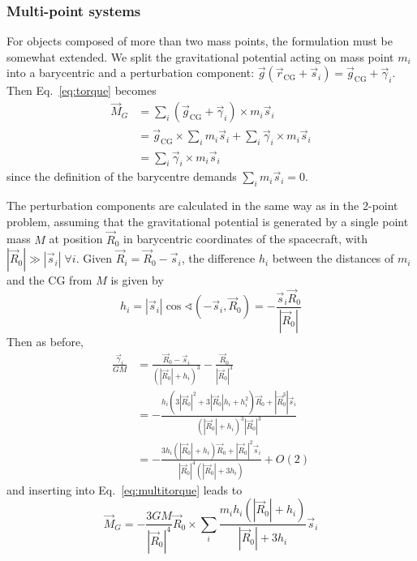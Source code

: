 \documentclass[Orbiter Technical Reference.tex]{subfiles}
\begin{document}
\subsubsection{Multi-point systems}
For objects composed of more than two mass points, the formulation must be somewhat extended. We split the gravitational potential acting on mass point $m_i$ into a barycentric and a perturbation component: $\vec{g}(\vec{r}_\text{CG} + \vec{s}_i) = \vec{g}_\text{CG} + \vec{\gamma}_i$.
Then Eq.~\ref{eq:torque} becomes
\begin{equation}\label{eq:multitorque}
\begin{split}
\vec{M}_G &= \sum_i (\vec{g}_\text{CG} + \vec{\gamma}_i) \times m_i \vec{s}_i\\
&= \vec{g}_\text{CG} \times \sum_i m_i \vec{s}_i + \sum_i \vec{\gamma}_i \times m_i \vec{s}_i\\
&= \sum_i \vec{\gamma}_i \times m_i \vec{s}_i
\end{split}
\end{equation}
since the definition of the barycentre demands $\sum_i m_i \vec{s}_i = 0$.

The perturbation components are calculated in the same way as in the 2-point problem, assuming that the gravitational potential is generated by a single point mass $M$ at position $\vec{R}_0$ in barycentric coordinates of the spacecraft, with $|\vec{R}_0| \gg |\vec{s}_i|\;\forall i$.
Given $\vec{R}_i = \vec{R}_0 - \vec{s}_i$, the difference $h_i$ between the distances of $m_i$ and the CG from $M$ is given by
\begin{equation*}
h_i = |\vec{s}_i| \cos\sphericalangle (-\vec{s}_i, \vec{R}_0)
= -\frac{\vec{s}_i \vec{R}_0}{|\vec{R}_0|}
\end{equation*}
Then as before,
\begin{equation*}
\begin{split}
\frac{\vec{\gamma}_i}{GM} &= \frac{\vec{R}_0 - \vec{s}_i}{(|\vec{R}_0|+h_i)^3} - \frac{\vec{R}_0}{|\vec{R}_0|^3} \\
&= -\frac{h_i(3|\vec{R}_0|^2 + 3|\vec{R}_0| h_i + h_i^2) \vec{R}_0 + |\vec{R}_0^3| \vec{s}_i}{(|\vec{R}_0|+h_i)^3 |\vec{R}_0|^3} \\
&= -\frac{3h_i(|\vec{R}_0|+h_i) \vec{R}_0 + |\vec{R}_0|^2 \vec{s}_i}{|\vec{R}_0|^4 (|\vec{R}_0| + 3h_i)} + O(2)
\end{split}
\end{equation*}
and inserting into Eq.~\ref{eq:multitorque} leads to
\begin{equation*}
\vec{M}_G = -\frac{3GM}{|\vec{R}_0|^4} \vec{R}_0 \times \sum_i
\frac{m_i h_i(|\vec{R}_0|+h_i)}{|\vec{R}_0| + 3h_i} \vec{s}_i
\end{equation*}
\end{document}
